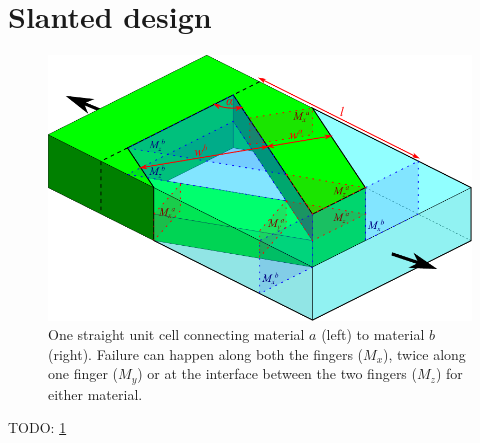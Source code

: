 \section{Slanted design}

\begin{figure}
	\centering
	\includegraphics[width=\columnwidth]{sources/method/diagonal_model_v3.pdf}
	\caption{
		One straight unit cell connecting material $a$ (left) to material $b$ (right).
		Failure can happen along both the fingers ($M_x$), twice along one finger ($M_y$) or at the interface between the two fingers ($M_z$) for either material.}
	\label{fig:diagonal_model}
\end{figure}

TODO: \cref{fig:diagonal_model}
